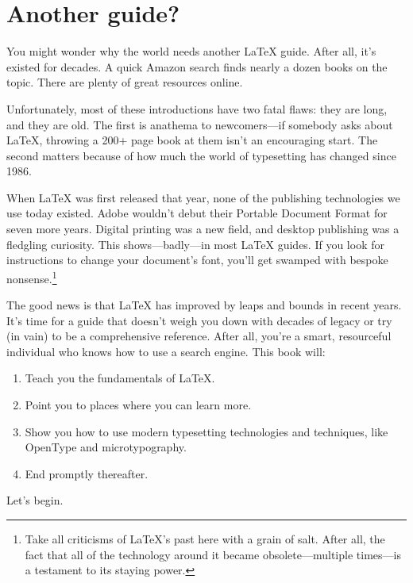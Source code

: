 \section{Another guide?}

You might wonder why the world needs another \LaTeX{} guide.
After all, it's existed for decades.
A quick Amazon search finds nearly a dozen books on the topic.
There are plenty of great resources online.

Unfortunately, most of these introductions have two fatal flaws: they are long,
and they are old.
The first is anathema to newcomers---if somebody asks about \LaTeX{},
throwing a 200+ page book at them isn't an encouraging start.
The second matters because of how much the world of typesetting has
changed since 1986.

When \LaTeX{} was first released that year, none of the publishing technologies
we use today existed.
Adobe wouldn't debut their Portable Document Format for seven more years.
Digital printing was a new field, and desktop publishing was a fledgling
curiosity.\punckern{}
This shows---badly---in most \LaTeX{} guides.
If you look for instructions to change your document's font,
you'll get swamped with bespoke nonsense.\punckern\footnote{%
Take all criticisms of \LaTeX's past here with a grain of
salt. After all, the fact that all of the technology around it became
obsolete---multiple times---is a testament to its staying power.}

The good news is that  \LaTeX{} has improved by leaps and bounds in recent years.
It's time for a guide that doesn't weigh you down with decades of legacy
or try (in vain) to be a comprehensive reference.
After all, you're a smart, resourceful individual who knows how to use a search
engine.
This book will:

\begin{enumerate}
\item Teach you the fundamentals of \LaTeX.
\item Point you to places where you can learn more.
\item Show you how to use modern typesetting technologies and techniques,
    like OpenType and microtypography.
\item End promptly thereafter.
\end{enumerate}
\vspace{\baselineskip}

\noindent Let's begin.
